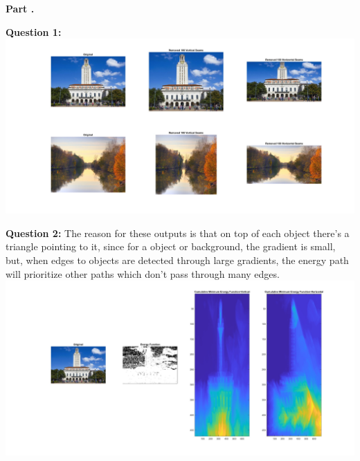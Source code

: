 \documentclass[11pt]{article}
\begin{document}
    \textbf{Part .}\newline
    
    \textbf{Question 1:}\newline
    \includegraphics[width=\linewidth]{Part 2 Pictures/question1}\newline

    \textbf{Question 2:}\newline
    The reason for these outputs is that on top of each object there's a
    triangle pointing to it, since for a object or background, the gradient
    is small, but, when edges to objects are detected through large
    gradients, the energy path will prioritize other paths which don't pass
    through many edges.\newline
    \includegraphics[width=\linewidth]{Part 2 Pictures/question2}\newline
\end{document}

